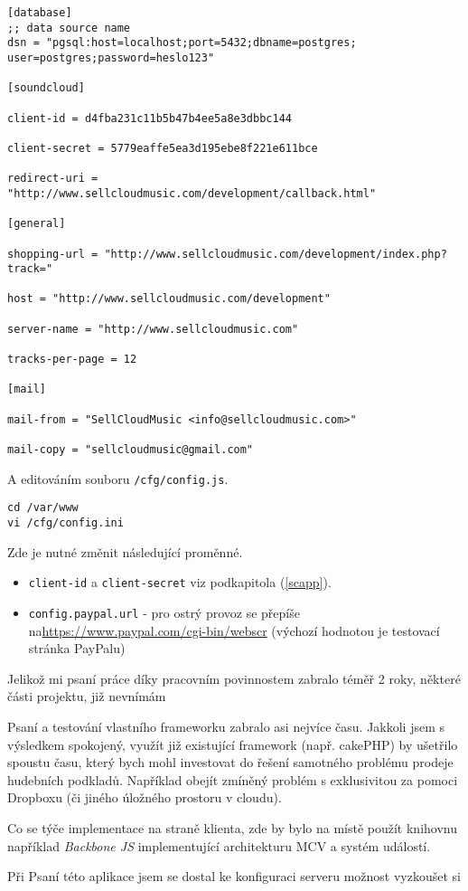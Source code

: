 \documentclass[12pt]{article}
\begin{document}
\lstset{language=sh}
\begin{lstlisting}[caption={config.ini}]
[database]
;; data source name 
dsn = "pgsql:host=localhost;port=5432;dbname=postgres;
user=postgres;password=heslo123"

[soundcloud]

client-id = d4fba231c11b5b47b4ee5a8e3dbbc144

client-secret = 5779eaffe5ea3d195ebe8f221e611bce

redirect-uri = "http://www.sellcloudmusic.com/development/callback.html"

[general]

shopping-url = "http://www.sellcloudmusic.com/development/index.php?track="

host = "http://www.sellcloudmusic.com/development"

server-name = "http://www.sellcloudmusic.com"

tracks-per-page = 12

[mail]

mail-from = "SellCloudMusic <info@sellcloudmusic.com>"

mail-copy = "sellcloudmusic@gmail.com"

\end{lstlisting}

A editováním souboru \texttt{/cfg/config.js}.

\begin{lstlisting}
cd /var/www
vi /cfg/config.ini
\end{lstlisting}

Zde je nutné změnit následující proměnné.

\begin{itemize}
\item{\texttt{client-id} a \texttt{client-secret}} viz podkapitola (\ref{scapp}).
\item{\texttt{config.paypal.url}} - pro ostrý provoz se přepíše na\newline \url{https://www.paypal.com/cgi-bin/webscr} (výchozí hodnotou je testovací stránka PayPalu)
\end{itemize}

\begin{conclusions-cz}

Jelikož mi psaní práce díky pracovním povinnostem zabralo téměř 2 roky, některé části projektu, již nevnímám 

Psaní a testování vlastního frameworku zabralo asi nejvíce času. Jakkoli jsem s výsledkem spokojený, využít již existující framework (např. cakePHP) by ušetřilo spoustu času, který bych mohl investovat do řešení samotného problému prodeje hudebních podkladů. Například obejít zmíněný problém s exklusivitou za pomoci Dropboxu (či jiného úložného prostoru v cloudu).

Co se týče implementace na straně klienta, zde by bylo na místě použít knihovnu například \emph{Backbone JS} implementující architekturu MCV a systém událostí.

Při Psaní této aplikace jsem se dostal ke konfiguraci serveru 
možnost vyzkoušet si 

\end{conclusions-cz}
\end{document}
